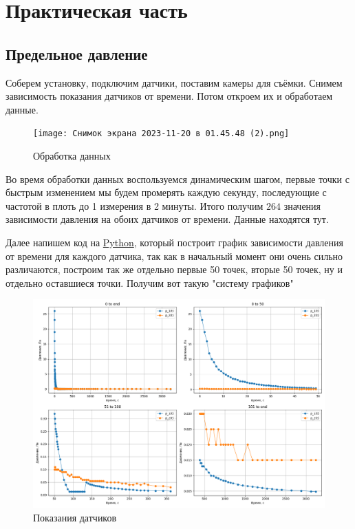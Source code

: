 \documentclass[12pt,oneside,a4paper]{article}
\begin{document}
\section{Практическая часть}
\subsection{Предельное давление}
Соберем установку, подключим датчики, поставим камеры для съёмки. Снимем зависимость показания датчиков от времени. Потом откроем их и обработаем данные.
\newpage
\begin{figure}
    \centering
    \texttt{[image: Снимок экрана 2023-11-20 в 01.45.48 (2).png]}
    \caption{Обработка данных}
    \label{fig:enter-label}
\end{figure}

Во время обработки данных воспользуемся динамическим шагом, первые точки с быстрым изменением мы будем промерять каждую секунду, последующие с частотой в плоть до 1 измерения в 2 минуты. Итого получим $264$ значения зависимости давления на обоих датчиков от времени. Данные находятся тут. 

Далее напишем код на \href{https://github.com/FriendBobik/MKT2}{Python}, который построит график зависимости давления от времени для каждого датчика, так как в начальный момент они очень сильно различаются, построим так же отдельно первые 50 точек, вторые 50 точек, ну и отдельно оставшиеся точки. Получим вот такую "систему графиков"
\newpage
\begin{figure}[!ht]
    \centering
    \includegraphics[width=1\linewidth]{garf_1.png}
    \caption{Показания датчиков}
    \label{fig:enter-label2}
\end{figure}
\end{document}
